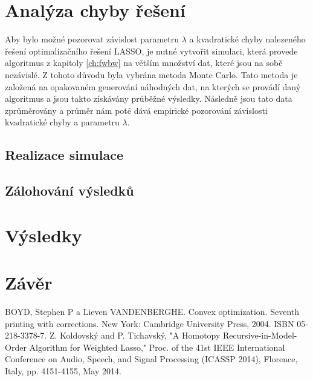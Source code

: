 \documentclass[FM,BP]{tulthesis}
\begin{document}
\chapter{Analýza chyby řešení}
\label{ch:simulace}
Aby bylo možné pozorovat závislost parametru $\lambda$ a kvadratické chyby nalezeného řešení optimalizačního řešení LASSO, je nutné vytvořit simulaci, která provede algoritmus z kapitoly \ref{ch:fwbw} na větším množství dat, které jsou na sobě nezávislé. Z tohoto důvodu byla vybrána metoda Monte Carlo. Tato metoda je založená na opakovaném generování náhodných dat, na kterých se provádí daný algoritmus a jsou takto získávány průběžné výsledky. Následně jsou tato data zprůměrovány a průměr nám poté dává empirické pozorování závislosti kvadratické chyby a parametru $\lambda$.
\section{Realizace simulace}
\section{Zálohování výsledků}
\chapter{Výsledky}
\label{ch:vysledky}

\chapter{Závěr}
\label{ch:end}

\renewcommand{\bibname}{Seznam použité literatury}
\begin{thebibliography}{99}
 BOYD, Stephen P a Lieven VANDENBERGHE. Convex optimization. Seventh printing with corrections. New York: Cambridge University Press, 2004. ISBN 05-218-3378-7.
Z. Koldovský and P. Tichavský, "A Homotopy Recursive-in-Model-Order Algorithm for Weighted Lasso," Proc. of the 41st IEEE International Conference on Audio, Speech, and Signal Processing (ICASSP 2014), Florence, Italy, pp. 4151-4155, May 2014.
\end{thebibliography}
\clearpage
\appendix
\end{document}
